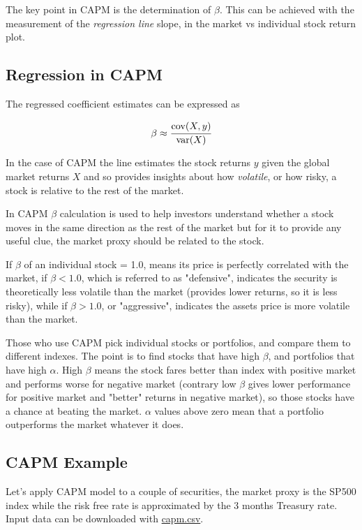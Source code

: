 The key point in CAPM is the determination of $\beta$. This can be achieved with the measurement of the \emph{regression line} slope, in the market vs individual stock return plot.

\subsection{Regression in CAPM}

The regressed coefficient estimates can be expressed as 

\begin{equation}
	\beta \approx \cfrac{\textrm{cov}(X,y)}{\textrm {var}(X)}
\end{equation}

In the case of CAPM the line estimates the stock returns $y$ given the global market returns $X$ and so provides insights about how \emph{volatile}, or how risky, a stock is relative to the rest of the market.

In CAPM $\beta$ calculation is used to help investors understand whether a stock moves in the same direction as the rest of the market but for it to provide any useful clue, the market proxy should be related to the stock.

If $\beta$ of an individual stock = 1.0, means its price is perfectly correlated with the market, if $\beta < 1.0$, which is referred to as "defensive", indicates the security is theoretically less volatile than the market (provides lower returns, so it is less risky), while if $\beta > 1.0$, or "aggressive", indicates the assets price is more volatile than the market.

Those who use CAPM pick individual stocks or portfolios, and compare them to different indexes. The point is to find stocks that have high $\beta$, and portfolios that have high $\alpha$. High $\beta$ means the stock fares better than index with positive market and performs worse for negative market (contrary low $\beta$ gives lower performance for positive market and "better" returns in negative market), so those stocks have a chance at beating the market. $\alpha$ values above zero mean that a portfolio outperforms the market whatever it does.

\subsection{CAPM Example}

Let's apply CAPM model to a couple of securities, the market proxy is the SP500 index while the risk free rate is approximated by the 3 months Treasury rate.
Input data can be downloaded with \href{https://raw.githubusercontent.com/matteosan1/finance_course/develop/libro/input_files/capm.csv}{capm.csv}.

